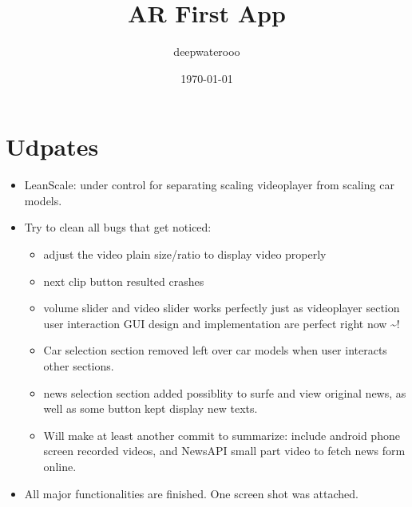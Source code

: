 \documentclass[9pt, b5paper]{article}
\author{deepwaterooo}
\date{\today}
\title{AR First App}
\begin{document}
\maketitle
\tableofcontents


\section{Udpates}
\label{sec-1}
\begin{itemize}
\item LeanScale: under control for separating scaling videoplayer from scaling car models.
\item Try to clean all bugs that get noticed: 
\begin{itemize}
\item adjust the video plain size/ratio to display video properly
\item next clip button resulted crashes
\item volume slider and video slider works perfectly just as videoplayer section user interaction GUI design and implementation are perfect right now \textasciitilde{}!
\item Car selection section removed left over car models when user interacts other sections.
\item news selection section added possiblity to surfe and view original news, as well as some button kept display new texts.
\item Will make at least another commit to summarize: include android phone screen recorded videos, and NewsAPI small part video to fetch news form online.
\end{itemize}
\item All major functionalities are finished. One screen shot was attached. 


\end{itemize}
\end{document}
